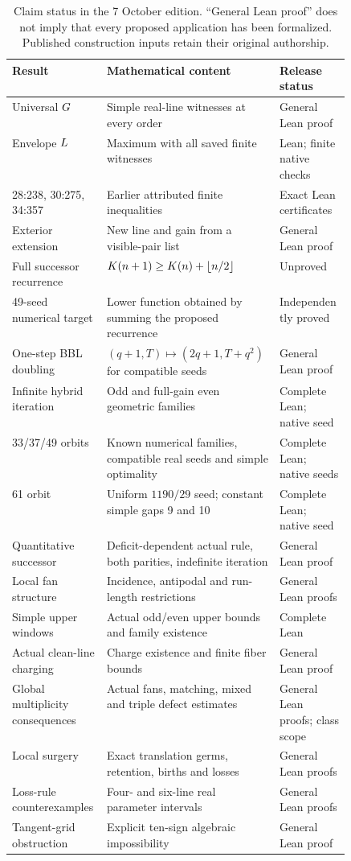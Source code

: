 \begin{table}[tbp]
\centering\small
\begin{tabularx}{\linewidth}{@{}P{0.28\linewidth}XP{0.21\linewidth}@{}}
\toprule
Result & Mathematical content & Release status\\
\midrule
Universal $G$ & Simple real-line witnesses at every order & General Lean proof\\
Envelope $L$ & Maximum with all saved finite witnesses & Lean; finite native checks\\
28:238, 30:275, 34:357 & Earlier attributed finite inequalities & Exact Lean certificates\\
Exterior extension & New line and gain from a visible-pair list & General Lean proof\\
Full successor recurrence & $K(n+1)\ge K(n)+\left\lfloor n/2\right\rfloor$ & Unproved\\
49-seed numerical target & Lower function obtained by summing the proposed recurrence & Independently proved\\
One-step BBL doubling & $(q+1,T)\mapsto(2q+1,T+q^2)$ for compatible seeds & General Lean proof\\
Infinite hybrid iteration & Odd and full-gain even geometric families & Complete Lean; native seed\\
33/37/49 orbits & Known numerical families, compatible real seeds and simple optimality & Complete Lean; native seeds\\
61 orbit & Uniform $1190/29$ seed; constant simple gaps 9 and 10 & Complete Lean; native seed\\
Quantitative successor & Deficit-dependent actual rule, both parities, indefinite iteration & General Lean proof\\
Local fan structure & Incidence, antipodal and run-length restrictions & General Lean proofs\\
Simple upper windows & Actual odd/even upper bounds and family existence & Complete Lean\\
Actual clean-line charging & Charge existence and finite fiber bounds & General Lean proof\\
Global multiplicity consequences & Actual fans, matching, mixed and triple defect estimates & General Lean proofs; class scope\\
Local surgery & Exact translation germs, retention, births and losses & General Lean proofs\\
Loss-rule counterexamples & Four- and six-line real parameter intervals & General Lean proofs\\
Tangent-grid obstruction & Explicit ten-sign algebraic impossibility & General Lean proof\\
\bottomrule
\end{tabularx}
\caption{Claim status in the 7 October edition. ``General Lean proof'' does not imply that every proposed application has been formalized. Published construction inputs retain their original authorship.}\label{tab:claims}
\end{table}

